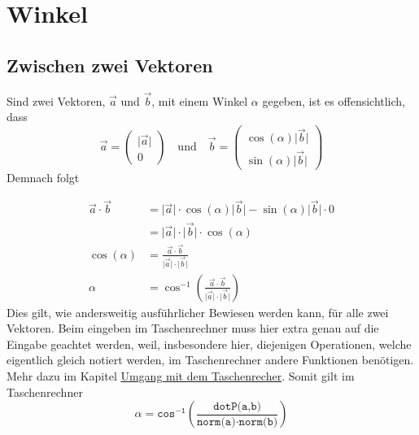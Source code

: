 \documentclass{article}
\begin{document}
   
\newcommand{\norm}[1]{\big| {#1} \big|}  
\newcommand{\vect}[1]{\overrightarrow{#1}} 
 
\section{Winkel}
\subsection{Zwischen zwei Vektoren} 
\begin{minipage}[t]{\dimexpr\textwidth-4cm} 
Sind zwei Vektoren, $\vect{a}$ und $\vect{b}$, mit einem Winkel $\alpha$ gegeben, ist es offensichtlich, dass
\[
 \vect{a} = \begin{pmatrix} \norm{\vect{a}} \\ 0 \end{pmatrix}
 \quad \text{und} \quad 
 \vect{b} = \begin{pmatrix} \cos(\alpha) \norm{\vect{b}} \\ \sin(\alpha) \norm{\vect{b}} \end{pmatrix}
\]
Demnach folgt
\end{minipage} 
\hfill
\begin{minipage}[t]{4cm} 
 \centering 
\end{minipage}
\begin{align*}
 \vect{a} \cdot \vect{b} &= \norm{\vect{a}} \cdot \cos(\alpha) \norm{\vect{b}} - \sin(\alpha) \norm{\vect{b}} \cdot 0 \\
 &= \norm{\vect{a}} \cdot \norm{\vect{b}} \cdot \cos(\alpha) \\
 \cos(\alpha) &= \frac{\vect{a} \cdot \vect{b}}{\norm{\vect{a}} \cdot  
\norm{\vect{b}}} \\ 
 \alpha &= \cos^{-1}\left({\frac{\vect{a} \cdot \vect{b}}{\norm{\vect{a}} \cdot  \norm{\vect{b}}}}\right)
\end{align*}
Dies gilt, wie andersweitig ausführlicher Bewiesen werden kann, für alle zwei Vektoren.
 Beim eingeben im Taschenrechner muss hier extra genau auf die Eingabe geachtet werden, weil, insbesondere hier, diejenigen Operationen, welche eigentlich gleich notiert werden, im Taschenrechner andere Funktionen benötigen. Mehr dazu im Kapitel \hyperref[Umgang mit dem Taschenrechner]{Umgang mit dem Taschenrecher}. Somit gilt im Taschenrechner
\[ 
 \alpha =
 \texttt{cos}^{-\texttt{1}}\left(
 \frac{\texttt{dotP(a,b)}}{\texttt{norm(a)}\cdot\texttt{norm(b)}}
 \right) 
\] 
  
\end{document}
